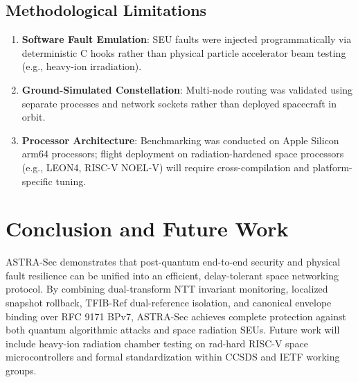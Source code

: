 \documentclass[conference,10pt]{IEEEtran}
\begin{document}
\subsection{Methodological Limitations}
\begin{enumerate}
    \item \textbf{Software Fault Emulation}: SEU faults were injected programmatically via deterministic C hooks rather than physical particle accelerator beam testing (e.g., heavy-ion irradiation).
    \item \textbf{Ground-Simulated Constellation}: Multi-node routing was validated using separate processes and network sockets rather than deployed spacecraft in orbit.
    \item \textbf{Processor Architecture}: Benchmarking was conducted on Apple Silicon arm64 processors; flight deployment on radiation-hardened space processors (e.g., LEON4, RISC-V NOEL-V) will require cross-compilation and platform-specific tuning.
\end{enumerate}

\section{Conclusion and Future Work}
\label{sec:conclusion}

ASTRA-Sec demonstrates that post-quantum end-to-end security and physical fault resilience can be unified into an efficient, delay-tolerant space networking protocol. By combining dual-transform NTT invariant monitoring, localized snapshot rollback, TFIB-Ref dual-reference isolation, and canonical envelope binding over RFC 9171 BPv7, ASTRA-Sec achieves complete protection against both quantum algorithmic attacks and space radiation SEUs. Future work will include heavy-ion radiation chamber testing on rad-hard RISC-V space microcontrollers and formal standardization within CCSDS and IETF working groups.




\appendices

\end{document}
